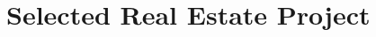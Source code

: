 \documentclass[11pt,a4paper,sans]{moderncv} %
\makeatletter
\newcommand*{\customcawards}[4]{
  \begin{tabular}{@{}l}
    {#2}
  \end{tabular}
  \hfill%
  \begin{tabular}{l@{}}
      \bfseries \itshape #3
  \end{tabular}
  \ifx&#4&%
  \else{\\%
    \begin{minipage}{\maincolumnwidth}%
      #4%
    \end{minipage}}\fi%
  \par\addvspace{#1}}
\makeatother
\begin{document}




\section{Selected Real Estate Project}
\end{document}
